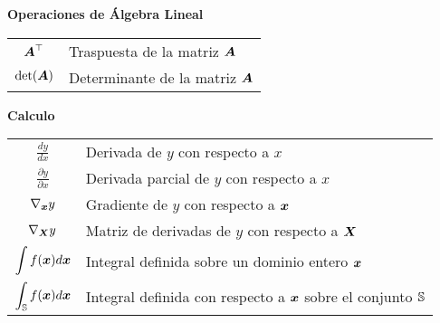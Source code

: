 \vspace{\notationgap}
\begin{minipage}{\textwidth}
\centerline{\bf Operaciones de Álgebra Lineal}
\bgroup
\def\arraystretch{1.5}
\begin{tabular}{cp{}}
$\displaystyle {\bm{A}}^\top$ & Traspuesta de la matriz ${\bm{A}}$ \\
$\displaystyle \mathrm{det}({\bm{A}})$ & Determinante de la matriz ${\bm{A}}$ \\
\end{tabular}
\egroup
{}
\end{minipage}

\vspace{\notationgap}
\begin{minipage}{\textwidth}
\centerline{\bf Calculo}
\bgroup
\def\arraystretch{1.5}
\begin{tabular}{cp{}}
$\displaystyle\frac{d y} {d x}$ & Derivada de $y$ con respecto a  $x$\\ [2ex]
$\displaystyle \frac{\partial y} {\partial x} $ & Derivada parcial de $y$ con respecto a $x$ \\
$\displaystyle \nabla_{\bm{x}} y $ & Gradiente de $y$ con respecto a ${\bm{x}}$ \\
$\displaystyle \nabla_{\bm{X}} y $ & Matriz de derivadas de $y$ con respecto a ${\bm{X}}$ \\
$\displaystyle \int f({\bm{x}}) d{\bm{x}} $ & Integral definida sobre un dominio entero ${\bm{x}}$ \\
$\displaystyle \int_{\mathbb{S}} f({\bm{x}}) d{\bm{x}}$ & Integral definida con respecto a ${\bm{x}}$ sobre el conjunto ${\mathbb{S}}$ \\
\end{tabular}
\egroup
{}
\end{minipage}

